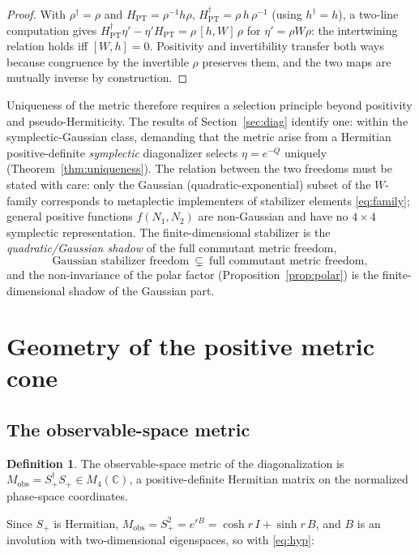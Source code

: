 \documentclass[11pt]{article}
\theoremstyle{definition}
\newtheorem{definition}[theorem]{Definition}
\theoremstyle{remark}
\newcommand{\C}{\mathbb{C}}
\newcommand{\Mobs}{M_{\mathrm{obs}}}
\newcommand{\dg}{\dagger}
\begin{document}
\begin{proof}
With $\rho^{\dg}=\rho$ and $H_{\mathrm{PT}}=\rho^{-1}h\rho$,
$H_{\mathrm{PT}}^{\dg}=\rho\,h\,\rho^{-1}$ (using $h^{\dg}=h$), a two-line
computation gives
$H_{\mathrm{PT}}^{\dg}\eta'-\eta'H_{\mathrm{PT}}=\rho\,[h,W]\,\rho$
for $\eta'=\rho W\rho$: the intertwining relation holds iff $[W,h]=0$.
Positivity and invertibility transfer both ways because congruence by the
invertible $\rho$ preserves them, and the two maps are mutually inverse by
construction.
\end{proof}

Uniqueness of the metric therefore requires a selection principle beyond
positivity and pseudo-Hermiticity.  The results of Section~\ref{sec:diag}
identify one: within the symplectic-Gaussian class, demanding that the metric
arise from a Hermitian positive-definite \emph{symplectic} diagonalizer
selects $\eta=e^{-Q}$ uniquely (Theorem~\ref{thm:uniqueness}).  The
relation between the two freedoms must be stated with care: only the
Gaussian (quadratic-exponential) subset of the $W$-family corresponds to
metaplectic implementers of stabilizer elements \eqref{eq:family};
general positive functions $f(N_1,N_2)$ are non-Gaussian and have no
$4\times4$ symplectic representation.  The finite-dimensional stabilizer
is the \emph{quadratic/Gaussian shadow} of the full commutant metric
freedom,
\begin{equation}
\text{Gaussian stabilizer freedom}\ \subsetneq\
\text{full commutant metric freedom},
\end{equation}
and the non-invariance of the polar
factor (Proposition~\ref{prop:polar}) is the finite-dimensional shadow of
the Gaussian part.

\section{Geometry of the positive metric cone}\label{sec:geometry}

\subsection{The observable-space metric}

\begin{definition}
The observable-space metric of the diagonalization is
$\Mobs=S_+^{\dg}S_+\in M_4(\C)$, a positive-definite Hermitian matrix on the
normalized phase-space coordinates.
\end{definition}

Since $S_+$ is Hermitian, $\Mobs=S_+^2=e^{rB}=\cosh r\,I+\sinh r\,B$, and $B$
is an involution with two-dimensional eigenspaces, so with
\eqref{eq:hyp}:
\end{document}
